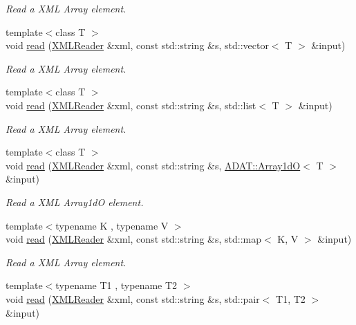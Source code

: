 \begin{DoxyCompactItemize}
\begin{DoxyCompactList}\small\item\em Read a X\+ML Array element. \end{DoxyCompactList}\item 
{\footnotesize template$<$class T $>$ }\\void \mbox{\hyperlink{group__io_gae58a41d3a914bc8eba546ada945fa97f}{read}} (\mbox{\hyperlink{classADATXML_1_1XMLReader}{X\+M\+L\+Reader}} \&xml, const std\+::string \&s, std\+::vector$<$ T $>$ \&input)
\begin{DoxyCompactList}\small\item\em Read a X\+ML Array element. \end{DoxyCompactList}\item 
{\footnotesize template$<$class T $>$ }\\void \mbox{\hyperlink{group__io_gacca340ef5b3a2ee3626cb544539f5e64}{read}} (\mbox{\hyperlink{classADATXML_1_1XMLReader}{X\+M\+L\+Reader}} \&xml, const std\+::string \&s, std\+::list$<$ T $>$ \&input)
\begin{DoxyCompactList}\small\item\em Read a X\+ML Array element. \end{DoxyCompactList}\item 
{\footnotesize template$<$class T $>$ }\\void \mbox{\hyperlink{group__io_gaba638604c3a98bce5724245a7fad4055}{read}} (\mbox{\hyperlink{classADATXML_1_1XMLReader}{X\+M\+L\+Reader}} \&xml, const std\+::string \&s, \mbox{\hyperlink{classADAT_1_1Array1dO}{A\+D\+A\+T\+::\+Array1dO}}$<$ T $>$ \&input)
\begin{DoxyCompactList}\small\item\em Read a X\+ML Array1dO element. \end{DoxyCompactList}\item 
{\footnotesize template$<$typename K , typename V $>$ }\\void \mbox{\hyperlink{group__io_ga01c7047fcb175e3518660cdab70536c9}{read}} (\mbox{\hyperlink{classADATXML_1_1XMLReader}{X\+M\+L\+Reader}} \&xml, const std\+::string \&s, std\+::map$<$ K, V $>$ \&input)
\begin{DoxyCompactList}\small\item\em Read a X\+ML Array element. \end{DoxyCompactList}\item 
{\footnotesize template$<$typename T1 , typename T2 $>$ }\\void \mbox{\hyperlink{group__io_gaa94af0693db4178d032a64ee2d3c5439}{read}} (\mbox{\hyperlink{classADATXML_1_1XMLReader}{X\+M\+L\+Reader}} \&xml, const std\+::string \&s, std\+::pair$<$ T1, T2 $>$ \&input)

\end{DoxyCompactItemize}
